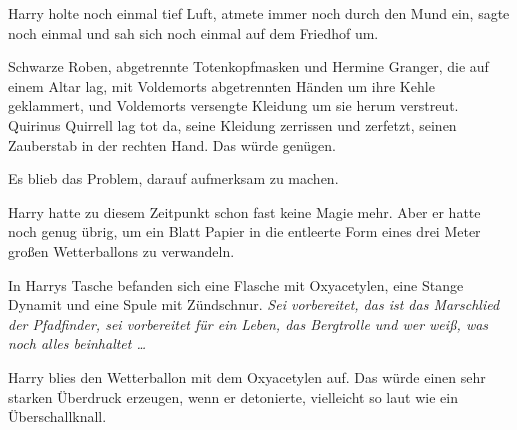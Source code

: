 Harry holte noch einmal tief Luft, atmete immer noch durch den Mund ein, sagte noch einmal  und sah sich noch einmal auf dem Friedhof um.

Schwarze Roben, abgetrennte Totenkopfmasken und Hermine Granger, die auf einem Altar lag, mit Voldemorts abgetrennten Händen um ihre Kehle geklammert, und Voldemorts versengte Kleidung um sie herum verstreut. Quirinus Quirrell lag tot da, seine Kleidung zerrissen und zerfetzt, seinen Zauberstab in der rechten Hand. Das würde genügen.

Es blieb das Problem, darauf aufmerksam zu machen.

Harry hatte zu diesem Zeitpunkt schon fast keine Magie mehr. Aber er hatte noch genug übrig, um ein Blatt Papier in die entleerte Form eines drei Meter großen Wetterballons zu verwandeln.

In Harrys Tasche befanden sich eine Flasche mit Oxyacetylen, eine Stange Dynamit und eine Spule mit Zündschnur.
\emph{Sei vorbereitet, das ist das Marschlied der Pfadfinder, sei vorbereitet für ein Leben, das Bergtrolle und wer weiß, was noch alles beinhaltet …}

Harry blies den Wetterballon mit dem Oxyacetylen auf. Das würde einen sehr starken Überdruck erzeugen, wenn er detonierte, vielleicht so laut wie ein Überschallknall.



